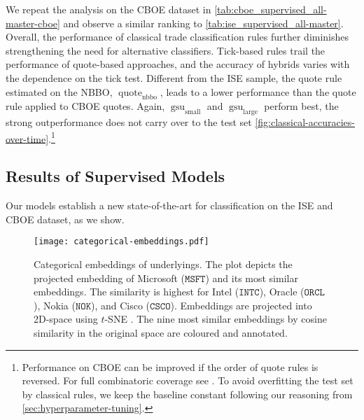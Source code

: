 We repeat the analysis on the \gls{CBOE} dataset in \cref{tab:cboe_supervised_all-master-cboe} and observe a similar ranking to \cref{tab:ise_supervised_all-master}. Overall, the performance of classical trade classification rules further diminishes strengthening the need for alternative classifiers. Tick-based rules trail the performance of quote-based approaches, and the accuracy of hybrids varies with the dependence on the tick test. Different from the \gls{ISE} sample, the quote rule estimated on the \gls{NBBO}, $\operatorname{quote}_{\mathrm{nbbo}}$, leads to a lower performance than the quote rule applied to \gls{CBOE} quotes.
Again, $\operatorname{gsu}_{\mathrm{small}}$ and $\operatorname{gsu}_{\mathrm{large}}$ perform best, the strong outperformance does not carry over to the test set \cref{fig:classical-accuracies-over-time}.\footnote{Performance on \gls{CBOE} can be improved if the order of quote rules is reversed. For full combinatoric coverage see \textcite[][33]{grauerOptionTradeClassification2022}. To avoid overfitting the test set by classical rules, we keep the baseline constant following our reasoning from \cref{sec:hyperparameter-tuning}.}


\subsection{Results of Supervised
    Models}\label{sec:results-of-supervised-models}

Our models establish a new state-of-the-art for classification on the \gls{ISE} and \gls{CBOE} dataset, as we show.

\begin{figure}[ht]
    \centering
    \texttt{[image: categorical-embeddings.pdf]}
    \caption[Categorical Embeddings of Underlyings]{Categorical embeddings of underlyings. The plot depicts the projected embedding of Microsoft ($\mathtt{MSFT}$) and its most similar embeddings. The similarity is highest for Intel ($\mathtt{INTC}$), Oracle ($\mathtt{ORCL}$), Nokia ($\mathtt{NOK}$), and Cisco ($\mathtt{CSCO}$). Embeddings are projected into 2D-space using $t$-SNE \autocite{vandermaatenVisualizingDataUsing2008}. The nine most similar embeddings by cosine similarity in the original space are coloured and annotated.}
    \label{fig:categorical-embeddings}
\end{figure}

